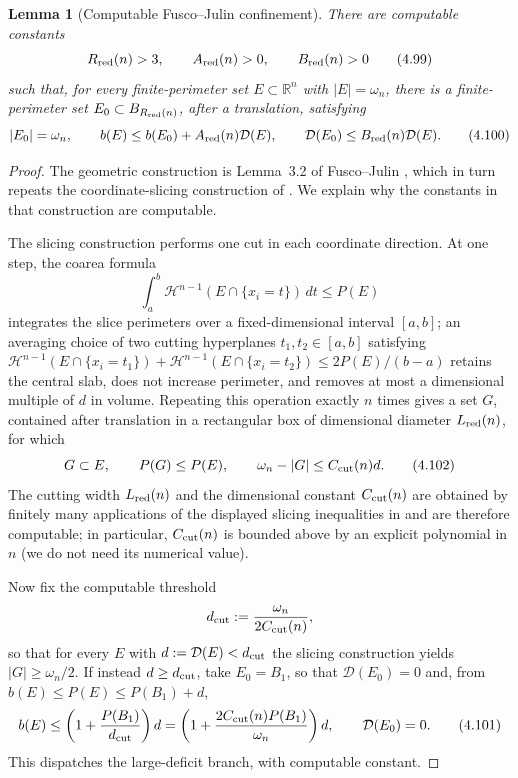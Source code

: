 \documentclass[11pt]{amsart}
\newtheorem{lemma}[theorem]{Lemma}
\theoremstyle{definition}
\newcommand{\R}{\mathbb R}
\newcommand{\Hn}{\mathcal H^{n-1}}
\newcommand{\Per}{P}
\newcommand{\Def}{\mathcal D}
\begin{document}
\begin{lemma}[Computable Fusco--Julin confinement]\label{lem:computable-confinement}
There are computable constants
\[
   R_{\rm red}(n)>3,\qquad
   A_{\rm red}(n)>0,\qquad B_{\rm red}(n)>0
\tag{4.99}\label{eq:reduction-data}
\]
such that, for every finite-perimeter set \(E\subset\R^n\) with
\(|E|=\omega_n\), there is a finite-perimeter set
\(E_0\subset B_{R_{\rm red}(n)}\), after a translation, satisfying
\[
   |E_0|=\omega_n,\qquad
   b(E)\le b(E_0)+A_{\rm red}(n)\Def(E),\qquad
   \Def(E_0)\le B_{\rm red}(n)\Def(E).
\tag{4.100}\label{eq:computable-confinement}
\]
\end{lemma}

\begin{proof}
The geometric construction is Lemma~3.2 of Fusco--Julin
\cite[Lemma~3.2]{FJ2014}, which in turn repeats the coordinate-slicing
construction of \cite[Lemma~5.1]{FMP2010}.  We explain why
the constants in that construction are computable.

The slicing construction performs one cut in each coordinate direction.
At one step, the coarea formula
\[
   \int_a^b \Hn(E\cap\{x_i=t\})\,dt\le\Per(E)
\]
integrates the slice perimeters over a fixed-dimensional interval
\([a,b]\); an averaging choice of two cutting hyperplanes \(t_1,t_2\in[a,b]\)
satisfying \(\Hn(E\cap\{x_i=t_1\})+\Hn(E\cap\{x_i=t_2\})\le 2\Per(E)/(b-a)\)
retains the central slab, does not increase perimeter, and removes at most a
dimensional multiple of \(d\) in volume.  Repeating this operation exactly
\(n\) times gives a set \(G\), contained after translation in a rectangular
box of dimensional diameter \(L_{\rm red}(n)\), for which
\[
   G\subset E,\qquad
   \Per(G)\le\Per(E),\qquad
   \omega_n-|G|\le C_{\rm cut}(n)d.
\tag{4.102}\label{eq:cut-output}
\]
The cutting width \(L_{\rm red}(n)\) and the dimensional constant
\(C_{\rm cut}(n)\) are obtained by finitely many applications of the displayed
slicing inequalities in \cite[Lemma 5.1]{FMP2010} and are therefore
computable; in particular, \(C_{\rm cut}(n)\) is bounded above by an
explicit polynomial in \(n\) (we do not need its numerical value).

Now fix the computable threshold
\begin{equation}\label{eq:dcut-explicit}
   d_{\rm cut}:=\frac{\omega_n}{2C_{\rm cut}(n)},
\end{equation}
so that for every \(E\) with \(d:=\Def(E)<d_{\rm cut}\) the slicing
construction yields \(|G|\ge\omega_n/2\).  If instead \(d\ge d_{\rm cut}\),
take \(E_0=B_1\), so that \(\Def(E_0)=0\) and, from \(b(E)\le\Per(E)\le
\Per(B_1)+d\),
\[
   b(E)\le\left(1+\frac{\Per(B_1)}{d_{\rm cut}}\right)d
        =\left(1+\frac{2C_{\rm cut}(n)\Per(B_1)}{\omega_n}\right)d,
   \qquad\Def(E_0)=0.
\tag{4.101}\label{eq:cut-large}
\]
This dispatches the large-deficit branch, with computable constant.


\end{proof}
\end{document}
